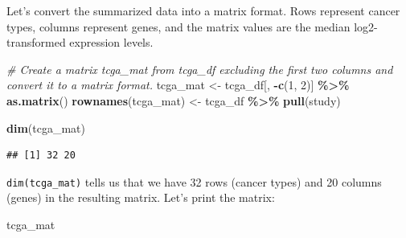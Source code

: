 \documentclass[
]{book}
\newenvironment{Shaded}{\begin{snugshade}}{\end{snugshade}}
\newcommand{\CommentTok}[1]{\textcolor[rgb]{0.56,0.35,0.01}{\textit{#1}}}
\newcommand{\DecValTok}[1]{\textcolor[rgb]{0.00,0.00,0.81}{#1}}
\newcommand{\FunctionTok}[1]{\textcolor[rgb]{0.13,0.29,0.53}{\textbf{#1}}}
\newcommand{\NormalTok}[1]{#1}
\newcommand{\OtherTok}[1]{\textcolor[rgb]{0.56,0.35,0.01}{#1}}
\newcommand{\SpecialCharTok}[1]{\textcolor[rgb]{0.81,0.36,0.00}{\textbf{#1}}}
\begin{document}
Let's convert the summarized data into a matrix format. Rows represent cancer types, columns represent genes, and the matrix values are the median log2-transformed expression levels.

\begin{Shaded}
\begin{Highlighting}[]
\CommentTok{\# Create a matrix \textquotesingle{}tcga\_mat\textquotesingle{} from \textquotesingle{}tcga\_df\textquotesingle{} excluding the first two columns and convert it to a matrix format.}
\NormalTok{tcga\_mat }\OtherTok{\textless{}{-}}\NormalTok{ tcga\_df[, }\SpecialCharTok{{-}}\FunctionTok{c}\NormalTok{(}\DecValTok{1}\NormalTok{, }\DecValTok{2}\NormalTok{)] }\SpecialCharTok{\%\textgreater{}\%} \FunctionTok{as.matrix}\NormalTok{()}
\FunctionTok{rownames}\NormalTok{(tcga\_mat) }\OtherTok{\textless{}{-}}\NormalTok{ tcga\_df }\SpecialCharTok{\%\textgreater{}\%} \FunctionTok{pull}\NormalTok{(study)}

\FunctionTok{dim}\NormalTok{(tcga\_mat)}
\end{Highlighting}
\end{Shaded}

\begin{verbatim}
## [1] 32 20
\end{verbatim}

\texttt{dim(tcga\_mat)} tells us that we have 32 rows (cancer types) and 20 columns (genes) in the resulting matrix. Let's print the matrix:

\begin{Shaded}
\begin{Highlighting}[]
\NormalTok{tcga\_mat}
\end{Highlighting}
\end{Shaded}
\end{document}

